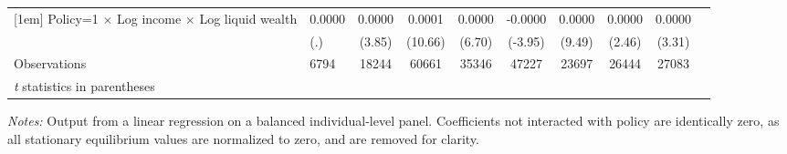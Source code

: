 \begin{table}[h!tbp]
\begin{tabular}{p{1.2in}l*{8}{c}}
[1em]
Policy=1 $\times$ Log income $\times$ Log liquid wealth&      0.0000&      0.0000&      0.0001&      0.0000&     -0.0000&      0.0000&      0.0000&      0.0000\\
                    &         (.)&      (3.85)&     (10.66)&      (6.70)&     (-3.95)&      (9.49)&      (2.46)&      (3.31)\\
\hline
Observations        &        6794&       18244&       60661&       35346&       47227&       23697&       26444&       27083\\
\hline\hline
\multicolumn{9}{l}{\footnotesize \textit{t} statistics in parentheses}\\
\end{tabular}
\textit{Notes:} Output from a linear regression on a balanced individual-level panel. Coefficients not interacted with policy are identically zero, as all stationary equilibrium values are normalized to zero, and are removed for clarity.
\end{table}
